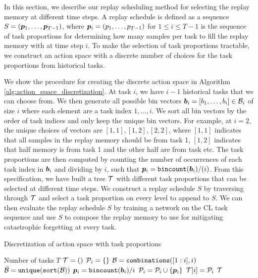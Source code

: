 In this section, we describe our replay scheduling method for selecting the replay memory at different time steps. A replay schedule is defined as a sequence $S = ({\bm{p}}_1, \dots, {\bm{p}}_{T-1})$, where ${\bm{p}}_i = (p_1, \dots, p_{T-1})$ for $1 \leq i \leq T-1$ is the sequence of task proportions for determining how many samples per task to fill the replay memory with at time step $i$. To make the selection of task proportions tractable, we construct an action space with a discrete number of choices for the task proportions from historical tasks. 

We show the procedure for creating the discrete action space in Algorithm \ref{alg:action_space_discretization}. At task $i$, we have $i-1$ historical tasks that we can choose from. We then generate all possible bin vectors ${\bm{b}}_i = [b_1, \dots, b_{i}] \in {\mathcal{B}}_i$ of size $i$ where each element are a task index $1, ..., i$. We sort all bin vectors by the order of task indices and only keep the unique bin vectors. For example, at $i=2$, the unique choices of vectors are $[1,1], [1,2], [2,2]$, where $[1,1]$ indicates that all samples in the replay memory should be from task 1, $[1,2]$ indicates that half memory is from task 1 and the other half are from task etc. The task proportions are then computed by counting the number of occurrences of each task index in ${\bm{b}}_i$ and dividing by $i$, such that ${\bm{p}}_i = \texttt{bincount}({\bm{b}}_i) / (i)$. From this specification, we have built a tree ${\mathcal{T}}$ with different task proportions that can be selected at different time steps. We construct a replay schedule $S$ by traversing through ${\mathcal{T}}$ and select a task proportion on every level to append to $S$. We can then evaluate the replay schedule $S$ by training a network on the CL task sequence and use $S$ to compose the replay memory to use for mitigating catastrophic forgetting at every task. %


\begin{algorithm}[t]
	\caption{Discretization of action space with task proportions}
	\label{alg:action_space_discretization}
	\begin{algorithmic}[1]
		\Require Number of tasks $T$
		\State ${\mathcal{T}} = ()$ 
		\State ${\mathcal{P}}_i = \{\}$ 
		\State ${\mathcal{B}} = \texttt{combinations}([1:i], i)$ 
		\State $\bar{{\mathcal{B}}} = \texttt{unique}(\texttt{sort}({\mathcal{B}}))$ 
		\State ${\bm{p}}_i = \texttt{bincount}({\bm{b}}_i) / i$ 
		\State ${\mathcal{P}}_i = {\mathcal{P}}_i \cup \{ {\bm{p}}_i \}$ 
		\EndFor
		\State ${\mathcal{T}}[i] = {\mathcal{P}}_i$ 
		\EndFor
		\State \Return ${\mathcal{T}}$ 
	\end{algorithmic}
\end{algorithm}



